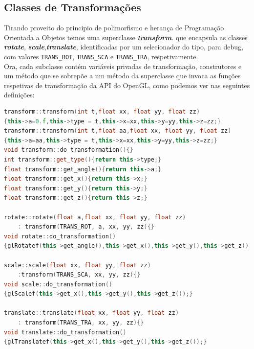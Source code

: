 \documentclass[14pt, a4paper]{article}
\begin{document}
\subsection{Classes de Transformações}\label{subsec:classes}
Tirando proveito do principio de polimorfismo e herança de Programação Orientada a Objetos temos uma
superclasse \textit{\textbf{transform}}. que encapsula as classes \textit{\textbf{rotate}},
\textit{\textbf{scale}},\textit{\textbf{translate}}, identificadas por um selecionador do tipo,
para debug, com valores \verb|TRANS_ROT|, \verb|TRANS_SCA| e \verb|TRANS_TRA|, respetivamente.\\
Ora, cada subclasse contém variáveis privadas de transformação, construtores e um método que se
sobrepõe a um método da superclasse que invoca as funções respetivas de transformação da API do OpenGL,
como podemos ver nas seguintes definições:
\begin{lstlisting}[language=c++]
transform::transform(int t,float xx, float yy, float zz)
{this->a=0.f,this->type = t,this->x=xx,this->y=yy,this->z=zz;}
transform::transform(int t,float aa,float xx, float yy, float zz)
{this->a=aa,this->type = t,this->x=xx,this->y=yy,this->z=zz;}
void transform::do_transformation(){}
int transform::get_type(){return this->type;}
float transform::get_angle(){return this->a;}
float transform::get_x(){return this->x;}
float transform::get_y(){return this->y;}
float transform::get_z(){return this->z;}

rotate::rotate(float a,float xx, float yy, float zz)
	: transform(TRANS_ROT, a, xx, yy, zz){}
void rotate::do_transformation()
{glRotatef(this->get_angle(),this->get_x(),this->get_y(),this->get_z());}

scale::scale(float xx, float yy, float zz)
	:transform(TRANS_SCA, xx, yy, zz){}
void scale::do_transformation()
{glScalef(this->get_x(),this->get_y(),this->get_z());}

translate::translate(float xx, float yy, float zz)
	: transform(TRANS_TRA, xx, yy, zz){}
void translate::do_transformation()
{glTranslatef(this->get_x(),this->get_y(),this->get_z());}

\end{lstlisting}
\end{document}
